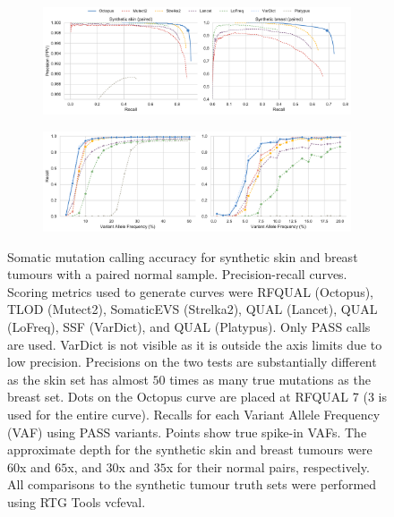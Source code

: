 \documentclass[notitlepage, twocolumn, 10pt]{article}
\begin{document}
\begin{figure}[ht!]
    \centering
\captionsetup[subfigure]{position=top,labelfont=bf,textfont=normalfont,singlelinecheck=off,justification=raggedright}
    \begin{subfigure}[b]{\textwidth}
        \vspace{-0.5cm}
        \caption{}
        \includegraphics[width=\textwidth]{figures/paired_somatic_precision_recall}
        \label{fig:paired-somatic-precision-recall}
    \end{subfigure}
    \begin{subfigure}[b]{\textwidth}
        \vspace{-1.0cm}
        \caption{}
        \includegraphics[width=\textwidth]{figures/paired_somatic_vaf_recall}
        \label{fig:paired-somatic-vaf-recall}
    \end{subfigure}
    \vspace{-1.0cm}
    \caption{Somatic mutation calling accuracy for synthetic skin and breast tumours with a paired normal sample.  \protect{} Precision-recall curves. Scoring metrics used to generate curves were RFQUAL (Octopus), TLOD (Mutect2), SomaticEVS (Strelka2), QUAL (Lancet), QUAL (LoFreq), SSF (VarDict), and QUAL (Platypus). Only PASS calls are used. VarDict is not visible as it is outside the axis limits due to low precision. Precisions on the two tests are substantially different as the skin set has almost $50$ times as many true mutations as the breast set. Dots on the Octopus curve are placed at RFQUAL 7 (3 is used for the entire curve). \protect{} Recalls for each Variant Allele Frequency (VAF) using PASS variants. Points show true spike-in VAFs. The approximate depth for the synthetic skin and breast tumours were $60$x and $65$x, and $30$x and $35$x for their normal pairs, respectively. All comparisons to the synthetic tumour truth sets were performed using RTG Tools vcfeval.}
    \label{fig:paired-somatic-eval}
\end{figure}
\end{document}
